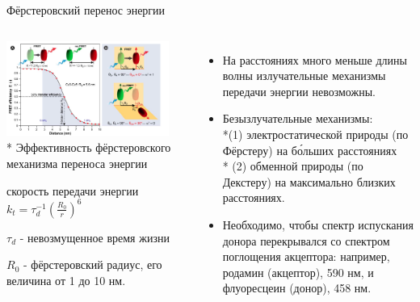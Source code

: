 \documentclass[9pt, compress, xcolor=table]{beamer}
\begin{document}
\begin{frame}{Фёрстеровский перенос энергии}
\begin{columns}[c]
\column{7cm}
\begin{center}
\includegraphics[width=0.9\textwidth]{nfm28}
\\* Эффективность фёрстеровского механизма переноса энергии

скорость передачи энергии $k_t = \tau_d^{-1}\left(\frac{R_0}{r}\right)^6$

$\tau_d$ - невозмущенное время жизни

$R_0$ - фёрстеровский радиус, его величина от 1 до 10 нм.

\end{center}
\column{5.5cm}
\begin{itemize}
\item На расстояниях много меньше длины волны излучательные механизмы передачи энергии невозможны.

\item Безызлучательные механизмы: \\*(1) электростатической природы (по Фёрстеру) на б\'ольших расстояниях \\* (2) обменной природы (по Декстеру) на максимально близких расстояниях.

\item Необходимо, чтобы спектр испускания донора перекрывался со спектром поглощения акцептора: например, родамин (акцептор), 590 нм, и флуоресцеин (донор), 458 нм.
\end{itemize}
\end{columns}

\end{frame}
\end{document}
